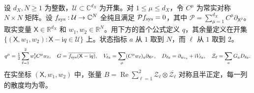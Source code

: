 设 $d_X,N\ge1$ 为整数，$\mathcal U\subset\mathbb C^{d_X}$ 为开集。对 $1\le\mu\le d_X$，令 $C^\mu$ 为常实对称 $N\times N$ 矩阵。设 $f_{\rm sys}:\mathcal U\to\mathbb C^N$ 全纯且满足 $\mathcal P f_{\rm sys}=0$，其中 $\mathcal P=\sum_{\mu=1}^{d_X} C^\mu\partial_{\mathsf X^\mu}$。取实变量 $\mathsf X\in\mathbb R^{d_X}$ 和 $w_1,w_2\in\mathbb R^N$。用下方的首个公式定义 $q$，其余量定义在开集 $\{(\mathsf X,w_1,w_2):\mathsf X-\mathrm i q\in\mathcal U\}$ 上。状态指标 $a$ 从 $1$ 取到 $N$，而 $\ell$ 从 $1$ 取到 $2$。
\[
q^\mu=\tfrac12\sum_{\ell=1}^2w_\ell^{\mathsf t}C^\mu w_\ell,\quad
G=\overline{f_{\rm sys}(\mathsf X-\mathrm i q)},\quad
V_{\ell a}=\sum_\mu(C^\mu w_\ell)_a\partial_{\mathsf X^\mu},\quad
D_{\ell a}=\partial_{w_{\ell a}}+\mathrm iV_{\ell a},\quad
\mathcal Z_\ell=\sum_aG_aD_{\ell a}.
\]
在实坐标 $(\mathsf X,w_1,w_2)$ 中，张量 $B=\operatorname{Re}\sum_{\ell=1}^2\mathcal Z_\ell\otimes\overline{\mathcal Z_\ell}$ 对称且半正定，每一列的散度均为零。
